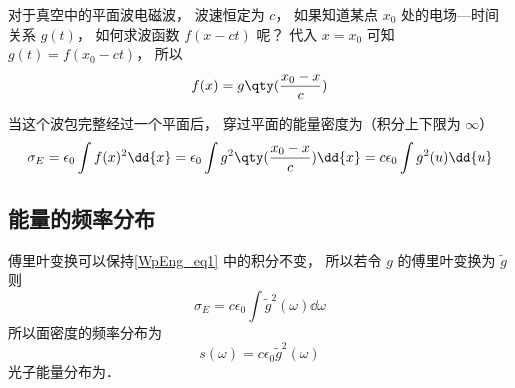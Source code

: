 
对于真空中的平面波电磁波， 波速恒定为 $c$， 如果知道某点 $x_0$ 处的电场—时间关系 $g(t)$， 如何求波函数 $f(x - ct)$ 呢？ 代入 $x = x_0$ 可知 $g(t) = f(x_0 - ct)$， 所以
\begin{equation}
f(x) = g\qty(\frac{x_0 - x}{c})
\end{equation}

当这个波包完整经过一个平面后， 穿过平面的能量密度为（积分上下限为 $\infty$）
\begin{equation}\label{WpEng_eq1}
\sigma_E = \epsilon_0 \int f(x)^2 \dd{x} = \epsilon_0  \int g^2\qty(\frac{x_0 - x}{c}) \dd{x} = c\epsilon_0 \int g^2(u) \dd{u}
\end{equation}

\subsection{能量的频率分布}
傅里叶变换可以保持\autoref{WpEng_eq1} 中的积分不变， 所以若令 $g$ 的傅里叶变换为 $\tilde g$ 则
\begin{equation}
\sigma_E = c\epsilon_0 \int {\tilde g}^2(\omega) \dd{\omega}
\end{equation}
所以面密度的频率分布为
\begin{equation}
s(\omega) = c\epsilon_0 {\tilde g}^2(\omega)
\end{equation}
光子能量分布为．
